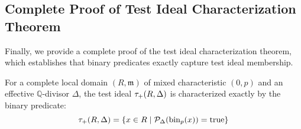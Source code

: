 \subsection{Complete Proof of Test Ideal Characterization Theorem}

Finally, we provide a complete proof of the test ideal characterization theorem, which establishes that binary predicates exactly capture test ideal membership.

\begin{theorem}\label{thm:test-ideal-characterization-complete}
For a complete local domain $(R,\mathfrak{m})$ of mixed characteristic $(0,p)$ and an effective $\mathbb{Q}$-divisor $\Delta$, the test ideal $\tau_+(R,\Delta)$ is characterized exactly by the binary predicate:
$$\tau_+(R,\Delta) = \{x \in R \mid \mathcal{P}_{\Delta}(\operatorname{bin}_p(x)) = \text{true}\}$$
\end{theorem}

